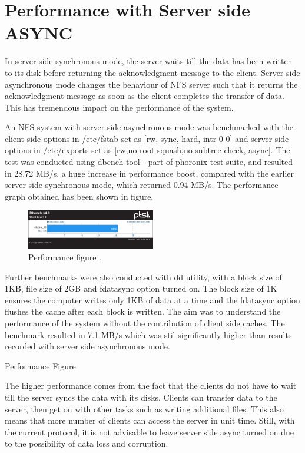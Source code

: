 \documentclass[conference]{IEEEtran}
\begin{document}
\section{Performance with Server side ASYNC}
In server side synchronous mode, the server waits till the data has been 
written to its disk before returning the acknowledgment message to the 
client. Server side asynchronous mode changes the behaviour of NFS server 
such that it returns the acknowledgment message as soon as the client 
completes the transfer of data. This has tremendous impact on the
performance of the system.

An NFS system with server side asynchronous mode was benchmarked with the
client side options in /etc/fstab set as [rw, sync, hard, intr 0 0] and
server side options in /etc/exports set as 
[rw,no-root-squash,no-subtree-check, async]. The test was conducted using
dbench tool - part of phoronix test suite, and resulted in 28.72 MB/s, a
huge increase in performance boost, compared with the earlier server side
synchronous mode, which returned 0.94 MB/s. The performance graph obtained has been shown in figure.
\begin{figure}[htbp]
\centerline{\includegraphics[width=0.5\textwidth,natwidth=400,natheight=300]{server_async_fig.png}}
\caption{Performance figure .}
\label{fig}
\end{figure}
Further benchmarks were also conducted with dd utility, with a block size
of 1KB, file size of 2GB and fdatasync option turned on. The block size of
1K ensures the computer writes only 1KB of data at a time and the fdatasync
option flushes the cache after each block is written. The aim was to
understand the performance of the system without the contribution of client
side caches. The benchmark resulted in 7.1 MB/s which was stil significantly
higher than results recorded with server side asynchronous mode.

Performance Figure

The higher performance comes from the fact that the clients do not have to 
wait till the server syncs the data with its disks. Clients can transfer
data to the server, then get on with other tasks such as writing additional
files. This also means that more number of clients can access the server
in unit time. Still, with the current protocol, it is not advisable to leave
server side async turned on due to the possibility of data loss and
corruption.
\end{document}
